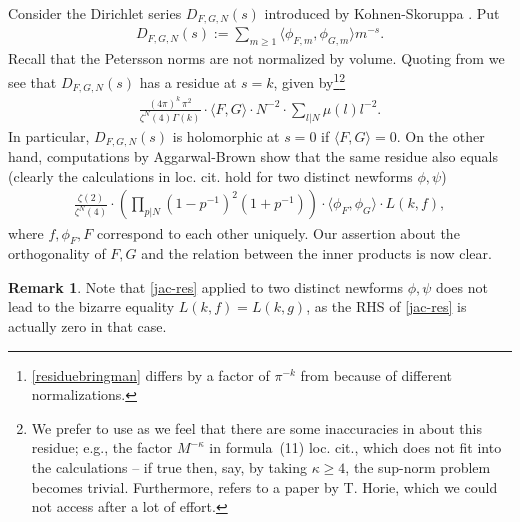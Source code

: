 \documentclass[11pt]{amsart}
\numberwithin{equation}{section}
\theoremstyle{plain}
\theoremstyle{definition}
\newtheorem{rmk}[thm]{Remark}
\newcommand{\lan}{\langle }
\newcommand{\ran}{\rangle}
\newcommand{\sumn}{\sum \nolimits}
\begin{document}
Consider the Dirichlet series $D_{F,G,N}(s)$ introduced by Kohnen-Skoruppa \cite{KS}. Put
\begin{align}
    D_{F,G,N}(s) := \sumn_{m \ge 1} \lan \phi_{F,m},\phi_{G,m} \ran m^{-s}.
\end{align}
Recall that the Petersson norms are not normalized by volume. Quoting from \cite[Theorem~3.72]{Br} we see that $D_{F,G,N}(s)$ has a residue at $s=k$, given by\footnote{\eqref{residuebringman} differs by a factor of $\pi^{-k}$ from \cite[Theorem~3.72]{Br} because of different normalizations.}{}\footnote{We prefer to use \cite{Br} as we feel that there are some inaccuracies in \cite{Ag-Br} about this residue; e.g., the factor $M^{-\kappa}$ in formula~(11) loc. cit., which does not fit into the calculations -- if true then, say, by taking $\kappa\ge 4$, the sup-norm problem becomes trivial. Furthermore, \cite{Ag-Br} refers to a paper by T. Horie, which we could not access after a lot of effort.} 
\begin{align}\label{residuebringman}
    \frac{(4 \pi)^k \, \pi^{2} }{\zeta^N(4)\Gamma(k)} \cdot \lan F,G \ran \cdot N^{-2} \cdot \sumn_{l|N} \mu(l)l^{-2}.
\end{align}
In particular, $D_{F,G,N}(s)$ is holomorphic at $s=0$ if $\lan F,G \ran =0$. On the other hand, computations by Aggarwal-Brown \cite{Ag-Br} show that the same residue also equals (clearly the calculations in loc. cit. hold for two distinct newforms $\phi,\psi$)
\begin{align} \label{jac-res}
        \frac{\zeta(2)}{\zeta^N(4)} \cdot \left(\prod\nolimits_{p|N}(1-p^{-1})^2(1+p^{-1}) \right)\cdot \lan \phi_F,\phi_G \ran \cdot L(k,f),
\end{align}
where $f,\phi_F,F$ correspond to each other uniquely. Our assertion about the orthogonality of $F,G$ and the relation between the inner products is now clear. 
\begin{rmk}
    Note that \eqref{jac-res} applied to two distinct newforms $\phi, \psi$ does not lead to the bizarre equality $L(k,f)=L(k,g)$, as the RHS of \eqref{jac-res} is actually zero in that case.
\end{rmk}
\end{document}
